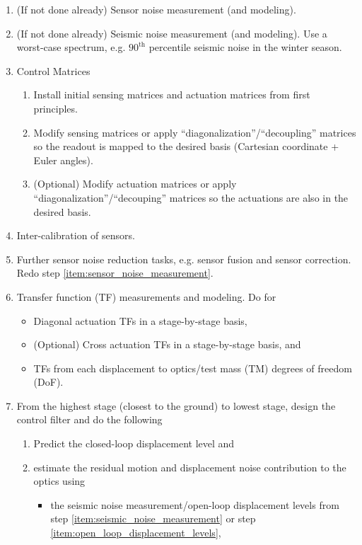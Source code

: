 \begin{enumerate}
	\item (If not done already) Sensor noise measurement (and modeling).  \label{item:sensor_noise_measurement}
	\item (If not done already) Seismic noise measurement (and modeling). Use a worst-case spectrum, e.g. $90^\mathrm{th}$ percentile seismic noise in the winter season. \label{item:seismic_noise_measurement}
	\item Control Matrices
	\begin{enumerate}
		\item Install initial sensing matrices and actuation matrices from first principles.
		\item Modify sensing matrices or apply ``diagonalization''/``decoupling'' matrices so the readout is mapped to the desired basis (Cartesian coordinate + Euler angles).
		\item (Optional) Modify actuation matrices or apply ``diagonalization''/``decouping'' matrices so the actuations are also in the desired basis.
	\end{enumerate}
	\item Inter-calibration of sensors.
	\item Further sensor noise reduction tasks, e.g. sensor fusion and sensor correction. Redo step \ref{item:sensor_noise_measurement}.
	\item Transfer function (TF) measurements and modeling. Do for
	\begin{itemize}
		\item Diagonal actuation TFs in a stage-by-stage basis, \label{item:diagonal_tf}
		\item (Optional) Cross actuation TFs in a stage-by-stage basis, and \label{item:cross_tf}
		\item TFs from each displacement to optics/test mass (TM) degrees of freedom (DoF). \label{item:displacement_to_optics_tf}
	\end{itemize}
	\item From the highest stage (closest to the ground) to lowest stage, design the control filter and do the following \label{item:design_control_filter}
	\begin{enumerate}
		\item Predict the closed-loop displacement level and
		\item estimate the residual motion and displacement noise contribution to the optics using
		\begin{itemize}
			\item the seismic noise measurement/open-loop displacement levels from step \ref{item:seismic_noise_measurement} or step \ref{item:open_loop_displacement_levels},

\end{itemize}
\end{enumerate}
\end{enumerate}
